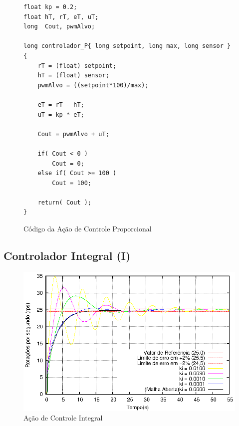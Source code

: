 \begin{figure}[!htb]
\centering
\begin{minipage}{0.8\linewidth}
\begin{lstlisting}
float kp = 0.2;
float hT, rT, eT, uT;
long  Cout, pwmAlvo;

long controlador_P{ long setpoint, long max, long sensor }
{
    rT = (float) setpoint;
    hT = (float) sensor;
    pwmAlvo = ((setpoint*100)/max);

    eT = rT - hT;
    uT = kp * eT;

    Cout = pwmAlvo + uT;

    if( Cout < 0 )
        Cout = 0;
    else if( Cout >= 100 )
        Cout = 100;

    return( Cout );
}
\end{lstlisting}
\end{minipage}
\caption{Código da Ação de Controle Proporcional}
\label{fig:codigoControladorP}
\end{figure}



\subsection{ Controlador Integral (I) }

\begin{figure}[!htb]
\center\includegraphics[scale=1]{./imagens/acaoI.eps}
\caption{Ação de Controle Integral}
\label{fig:acaoI}
\end{figure}




